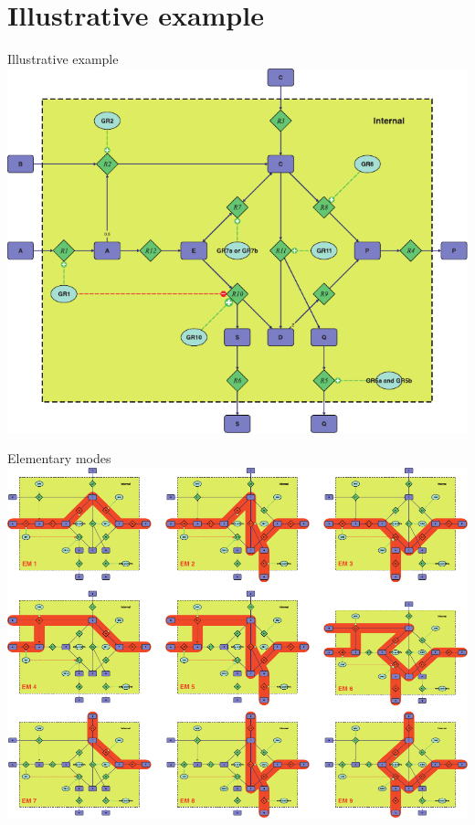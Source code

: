 \documentclass{beamer}
\begin{document}
\section{Illustrative example}
\begin{frame}{Illustrative example}
    \includegraphics[width=.9\textwidth]{grafik/fig1} \\
\end{frame}


\begin{frame}{Elementary modes}
    \includegraphics[width=.9\textwidth]{grafik/fig2} \\
\end{frame}
\end{document}
